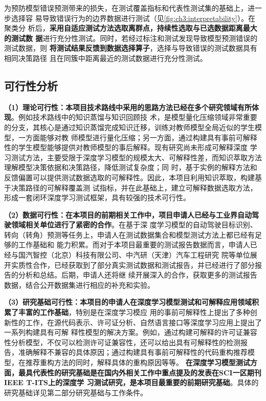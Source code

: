 为预防模型错误预测带来的损失，在测试覆盖指标和代表性测试集的基础上，进一步选择容
易导致错误行为的边界数据进行测试（见\cref{fig:ch3:interpretability}）。在聚类分
析后，\textbf{采用自适应测试方法选取离群点，持续性选取与已选数据距离最大的测试数
    据}进行充分性测试。同时，若经过标注和测试发现导致模型预测错误的测试数据，则
\textbf{将测试结果反馈到数据选择算子}，选择与导致错误的测试数据具有相同决策路径
且在同簇中距离最近的测试数据进行充分性测试。

\subsection{可行性分析}

\textbf{（1）理论可行性：本项目技术路线中采用的思路方法已经在多个研究领域有所体现}。例如技术路线中的知识蒸馏与知识回顾技
术，是模型量化压缩领域非常重要的分支，其核心是通过知识蒸馏完成知识迁移，训练对教师模型全局近似的学生模型，一方面能够对教
师模型进行量化压缩；另一方面，通过构建具有事前可解释性的学生模型能够提供对教师模型的事后解释。现有研究尚未形成可解释深度
学习测试方法，主要受限于深度学习模型的规模太大、可解释性差，而知识萃取方法理解模型决策依据和决策路径，降低测试复杂度；同
时，基于实例的解释方法和反馈偏置可以提供测试数据选取的可解释性。因此，本项目利用知识萃取，构建基于决策路径的可解释覆盖测
试指标，并在此基础上，建立可解释数据选取方法，形成一套闭环深度学习测试框架，具有较强的技术可行性。


\textbf{（2）数据可行性：在本项目的前期相关工作中，项目申请人已经与工业界自动驾驶领域相关单位进行了紧密的合作}。在基于深
度学习模型的自动驾驶目标识别、转向（转角）预测等任务上，申请人在测试数据集合和模型测试方法上都已经有足够的工作基础和
能力积累。而对于本项目最重要的测试报告数据而言，申请人已经与国汽智控（北京）科技有限公司、中汽研（天津）汽车工程研究
院等单位展开实质性合作，已经获取到了部分真实测试数据和测试报告，并已经进行了部分报告的分析和总结。后期，申请人还将继
续开展深入的合作，获取更多的测试报告数据，结合公开数据集进行相应的补充和实验。

\textbf{（3）研究基础可行性：本项目的申请人在深度学习模型测试和可解释应用领域积累了丰富的工作基础}，特别是在深度学习模应
用的事前可解释性上提出了多种创新性的工作，在源代码表示、许可证分析、自然语言接口等深度学习应用上提出了一系列构建具有可解
释性模型的解决方案。例如，通过构建可解释的许可证兼容性分析模型，不仅可以检测许可证兼容性，还可以给出具有可解释性的检测报
告，准确解释不兼容的具体原因；通过构建具有事前可解释性的代码重构推荐模型，在推荐重构方法的同时，解释具体的重构原因等等。
\textbf{在深度学习模型测试方面，最具代表性的研究基础是在国内外相关工作中重点提及的发表在SCI一区期刊IEEE T-ITS上的深度学
    习测试研究，是本项目最重要的前期研究基础}。具体的研究基础详见第二部分研究基础与工作条件。

